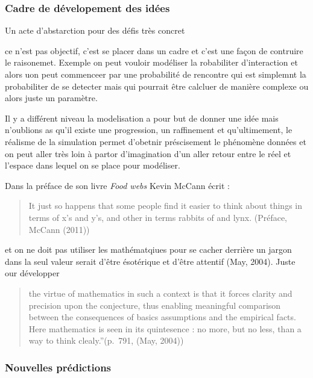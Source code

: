 \subsubsection*{Cadre de dévelopement des
idées}\label{cadre-de-duxe9velopement-des-iduxe9es}

Un acte d'abstarction pour des défis très concret

ce n'est pas objectif, c'est se placer dans un cadre et c'est une façon
de contruire le raisonemet. Exemple on peut vouloir modéliser la
robabiliter d'interaction et alors uon peut commenceer par une
probabilité de rencontre qui est simplemnt la probabiliter de se
detecter mais qui pourrait être calcluer de manière complexe ou alors
juste un paramètre.

Il y a différent niveau la modelisation a pour but de donner une idée
mais n'oublions as qu'il existe une progression, un raffinement et
qu'ultimement, le réalisme de la simulation permet d'obetnir
préscisement le phénomène données et on peut aller très loin à partor
d'imagination d'un aller retour entre le réel et l'espace dans lequel on
se place pour modéliser.

Dans la préface de son livre \emph{Food webs} Kevin McCann écrit :

\begin{quote}
\guillemotleft It just so happens that some people find it easier to
think about things in terms of x's and y's, and other in terms rabbits
of and lynx. \guillemotright (Préface, McCann (2011))
\end{quote}

et on ne doit pas utiliser les mathématqiues pour se cacher derrière un
jargon dans la seul valeur serait d'être ésotérique et d'être attentif
(May, 2004). Juste our développer

\begin{quote}
the virtue of mathematics in such a context is that it forces clarity
and precision upon the conjecture, thus enabling meaningful comparison
between the consequences of basics assumptions and the empirical facts.
Here mathematics is seen in its quintesence : no more, but no less, than
a way to think clealy.''(p.~791, (May, 2004))
\end{quote}

\subsubsection*{Nouvelles prédictions}\label{nouvelles-pruxe9dictions}

